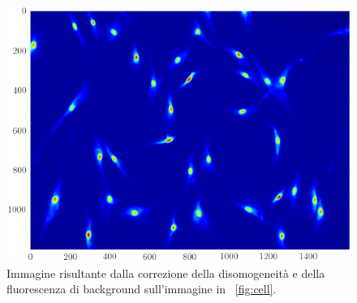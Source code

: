 \begin{figure}
 \centering
 \includegraphics[scale=.64]{img/CAP3cellcorr.png}
 \caption{\small{Immagine risultante dalla correzione della disomogeneità e della fluorescenza di background sull'immagine in \figurename~\ref{fig:cell}.}}
 \label{fig:cellcorr}
\end{figure}